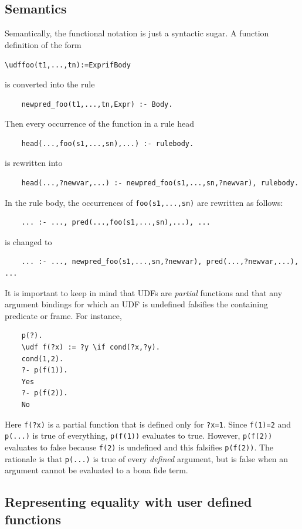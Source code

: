 \documentclass[11pt]{article}
\newcommand{\bs}{\textbackslash}
\begin{document}
\subsection{Semantics}

Semantically,
the functional notation is just a syntactic sugar. A function definition
of the form
\begin{alltt}
    \bs{}udf foo(t1,...,tn) := Expr if Body
\end{alltt}
is converted into the rule
\begin{verbatim}
    newpred_foo(t1,...,tn,Expr) :- Body.
\end{verbatim}
Then every occurrence of the function in a rule head
\begin{verbatim}
    head(...,foo(s1,...,sn),...) :- rulebody.
\end{verbatim}
is rewritten into
\begin{verbatim}
    head(...,?newvar,...) :- newpred_foo(s1,...,sn,?newvar), rulebody.
\end{verbatim}
In the rule body, the occurrences of \texttt{foo(s1,...,sn)}  are rewritten as
follows:
\begin{verbatim}
    ... :- ..., pred(...,foo(s1,...,sn),...), ...
\end{verbatim}
is changed to
\begin{verbatim}
    ... :- ..., newpred_foo(s1,...,sn,?newvar), pred(...,?newvar,...), ...
\end{verbatim}

It is important to keep in mind that UDFs are \emph{partial} functions and
that any argument bindings for which an UDF is undefined falsifies the
containing predicate or frame. For instance,
\begin{verbatim}
    p(?).
    \udf f(?x) := ?y \if cond(?x,?y).
    cond(1,2).
    ?- p(f(1)).
    Yes
    ?- p(f(2)).
    No
\end{verbatim}
Here \texttt{f(?x)} is a partial function that is defined only for
\texttt{?x=1}. Since \texttt{f(1)=2} and \texttt{p(...)} is true of everything,
\texttt{p(f(1))} evaluates to true. However,  \texttt{p(f(2))} evaluates to
false because \texttt{f(2)} is undefined and this falsifies
\texttt{p(f(2))}. The rationale is that \texttt{p(...)} is true of every
\emph{defined} argument, but is false when an argument cannot be evaluated
to a bona fide term.


\subsection{Representing equality with user defined functions}
\end{document}
